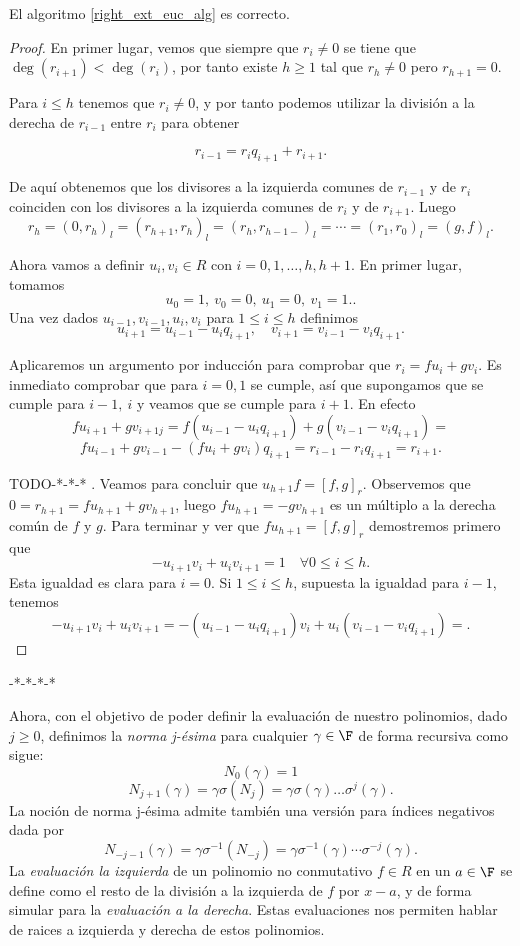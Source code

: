 \begin{theorem}
    El algoritmo  \ref{right_ext_euc_alg} es correcto.
\end{theorem}
\begin{proof}
    En primer lugar, vemos que siempre que \(r_i \neq 0\) se tiene que \(\deg(r_{i+1}) < \deg(r_i)\), por tanto existe  \(h \geq 1\) tal que \(r_h \neq 0\) pero \(r_{h+1} = 0\).

Para \(i \leq h\) tenemos que \(r_i \neq 0\), y por tanto podemos utilizar la división a la derecha de \(r_{i-1}\) entre \(r_i\) para obtener

\[
r_{i-1} = r_i q_{i+1} + r_{i+1}
.\]

De aquí obtenemos que los divisores a la izquierda comunes de \(r_{i-1}\) y de \(r_i\) coinciden con los divisores a la izquierda comunes de  \(r_i\) y de  \(r_{i+1}\). Luego
\[
r_h = (0, r_h)_l = (r_{h+1}, r_h)_l = (r_h, r_{h-1-})_l = \cdots = (r_1, r_0)_l = (g,f)_l
.\]

Ahora vamos a definir \(u_i, v_i \in R\) con \(i = 0,1, \dots, h, h+1\). En primer lugar, tomamos
\[
u_0 = 1,\ v_0 = 0,\ u_1 = 0,\ v_1 = 1.
.\]
Una vez dados \(u_{i-1}, v_{i-1}, u_i, v_i\) para \(1 \leq i \leq h\) definimos
\[
u_{i+1} = u_{i-1} - u_iq_{i+1}, \quad
v_{i+1} = v_{i-1} - v_iq_{i+1}
.\]

Aplicaremos un argumento por inducción para comprobar que \(r_i = fu_i + gv_i\). Es inmediato comprobar que para \(i = 0,1\) se cumple, así que supongamos que se cumple para \(i-1,\ i\) y veamos que se cumple para \(i+1\). En efecto
\[
f u_{i+1} + g v_{i+1j} = f(u_{i-1} - u_iq_{i+1}) + g(v_{i-1} - v_iq_{i+1}) =
\]
\[
f u_{i-1} + g v_{i-1} - (f u_i + g v_i)q_{i+1} = r_{i-1} - r_iq_{i+1} = r_{i+1}
.\]

TODO-*-*-*
. Veamos para concluir que \(u_{h+1}f = [f,g]_r\). Observemos que \(0 = r_{h+1} = fu_{h+1} + gv_{h+1}\), luego \(fu_{h+1} = -gv_{h+1}\) es un múltiplo a la derecha común de \(f\) y \(g\). Para terminar y ver que \(f u_{h+1} = [f,g]_r\) demostremos primero que
\[-u_{i+1}v_i + u_iv_{i+1} = 1\quad \forall 0 \leq i \leq h.\]
Esta igualdad es clara para \(i = 0\). Si \(1 \leq i \leq h\), supuesta la igualdad para \(i-1\), tenemos
\[
-u_{i+1}v_i + u_iv_{i+1} = -(u_{i-1} - u_iq_{i+1})v_i + u_i(v_{i-1} - v_iq_{i+1}) =
.\]
\end{proof}
-*-*-*-*

Ahora, con el objetivo de poder definir la evaluación de nuestro polinomios, dado \(j \geq 0\), definimos la \textit{norma j-ésima} para cualquier \(\gamma \in \F\) de forma recursiva como sigue:
\[
N_0(\gamma) = 1
\]
\[
N_{j+1}(\gamma) = \gamma \sigma(N_{j}) = \gamma \sigma(\gamma)\dots\sigma^{j}(\gamma)
.\]
La noción de norma j-ésima admite también una versión para índices negativos dada por
\[
N_{-j-1}(\gamma) = \gamma \sigma^{-1}(N_{-j}) =  \gamma \sigma^{-1}(\gamma) \cdots \sigma^{-j}(\gamma)
.\]
La \textit{evaluación la izquierda} de un polinomio no conmutativo \(f \in R\) en un \(a \in \F\) se define como el resto de la división a la izquierda de \(f\) por  \(x - a\), y de forma simular para la  \textit{evaluación a la derecha}. Estas evaluaciones nos permiten hablar de raices a izquierda y derecha de estos polinomios.

